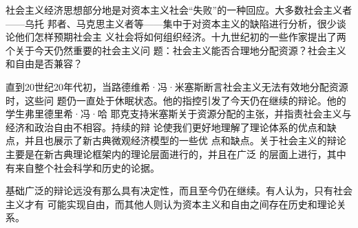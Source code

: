 社会主义经济思想部分地是对资本主义社会“失败”的一种回应。大多数社会主义者——乌托
邦者、马克思主义者等——集中于对资本主义的缺陷进行分析，很少谈论他们怎样预期社会主
义社会将如何组织经济。十九世纪初的一些作家提出了两个关于今天仍然重要的社会主义问
题：社会主义能否合理地分配资源？社会主义和自由是否兼容？

直到20世纪20年代初，当路德维希·冯·米塞斯断言社会主义无法有效地分配资源时，这些问
题仍一直处于休眠状态。他的指控引发了今天仍在继续的辩论。他的学生弗里德里希·冯·哈
耶克支持米塞斯关于资源分配的主张，并指责社会主义与经济和政治自由不相容。持续的辩
论使我们更好地理解了理论体系的优点和缺点，并且也展示了新古典微观经济模型的一些优
点和缺点。关于社会主义的辩论主要是在新古典理论框架内的理论层面进行的，并且在广泛
的层面上进行，其中有来自整个社会科学和历史的论据。

基础广泛的辩论远没有那么具有决定性，而且至今仍在继续。有人认为，只有社会主义才有
可能实现自由，而其他人则认为资本主义和自由之间存在历史和理论关系。



